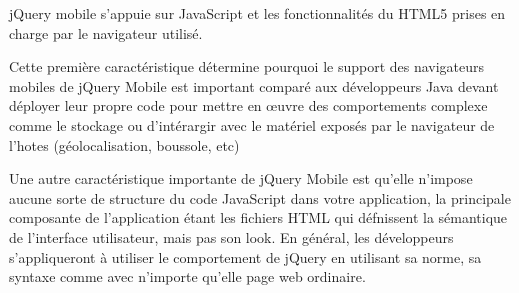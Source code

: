 jQuery mobile s’appuie sur JavaScript et les fonctionnalités du HTML5 prises en charge par le navigateur utilisé.

Cette première caractéristique détermine pourquoi le support des navigateurs mobiles de jQuery Mobile est important comparé aux développeurs Java devant déployer leur propre code pour mettre en œuvre des comportements complexe comme le stockage ou d’intérargir avec le matériel exposés par le navigateur de l’hotes (géolocalisation, boussole, etc)

Une autre caractéristique importante de jQuery Mobile est qu’elle n’impose aucune sorte de structure du code JavaScript dans votre application, la principale composante de l’application étant les fichiers HTML qui défnissent la sémantique de l’interface utilisateur, mais pas son look. En général, les développeurs s’appliqueront à utiliser le comportement de jQuery en utilisant sa norme, sa syntaxe comme avec n’importe qu’elle page web ordinaire.